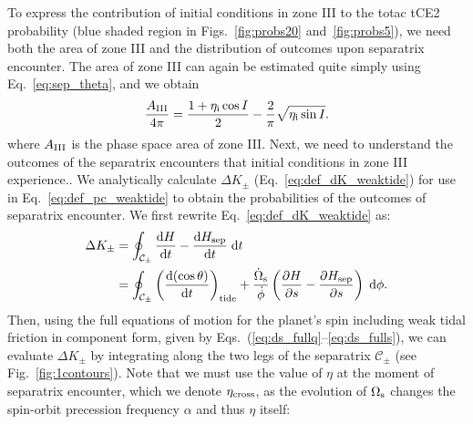 \documentclass[
        fleqn,
        usenatbib,
    ]{mnras}
\newcommand*{\rd}[2]{\frac{\mathrm{d}#1}{\mathrm{d}#2}}
\newcommand*{\pd}[2]{\frac{\partial#1}{\partial#2}}
\newcommand*{\p}[1]{\left(#1\right)}
\begin{document}
To express the contribution of initial conditions in zone III to the totac tCE2
probability (blue shaded region in Figs.~\ref{fig:probs20}
and~\ref{fig:probs5}), we need both the area of zone III and the distribution of
outcomes upon separatrix encounter. The area of zone III can again be estimated
quite simply using Eq.~\eqref{eq:sep_theta}, and we obtain
\begin{align}
    \frac{A_{\rm III}}{4\pi}
        = \frac{1 + \eta_{\rm i} \cos I}{2} -
            \frac{2}{\pi}\sqrt{\eta_{\rm i} \sin I}.
\end{align}
where $A_{\rm III}$ is the phase space area of zone III\@. Next, we need to
understand the outcomes of the separatrix encounters that initial conditions in
zone III experience.. We analytically calculate $\Delta K_{\pm}$
(Eq.~\ref{eq:def_dK_weaktide}) for use in Eq.~\eqref{eq:def_pc_weaktide} to
obtain the probabilities of the outcomes of separatrix encounter. We first
rewrite Eq.~\eqref{eq:def_dK_weaktide} as:
\begin{align}
    \Delta K_{\pm} &= \oint_{\mathcal{C}_{\pm}} \rd{H}{t}
        - \rd{H_{\rm sep}}{t}\;\mathrm{d}t
        \nonumber\\
        &= \oint_{\mathcal{C}_{\pm}}
           \p{\rd{(\cos\theta)}{t}}_{\rm tide}
            + \frac{\dot{\Omega}_{\rm s}}{\dot{\phi}}
            \p{\pd{H}{s} - \pd{H_{\rm sep}}{s}}\;\mathrm{d}\phi
                \label{eq:app_dhpm}.
\end{align}
Then, using the full equations of motion for the planet's spin including weak
tidal friction in component form, given by
Eqs.~(\ref{eq:ds_fullq}--\ref{eq:ds_fulls}), we can evaluate $\Delta K_{\pm}$ by
integrating along the two legs of the separatrix $\mathcal{C}_{\pm}$ (see
Fig.~\ref{fig:1contours}). Note that we must use the value of $\eta$ at the
moment of separatrix encounter, which we denote $\eta_{\rm cross}$, as the
evolution of $\Omega_{\rm s}$ changes the spin-orbit precession frequency
$\alpha$ and thus $\eta$ itself:
\end{document}
